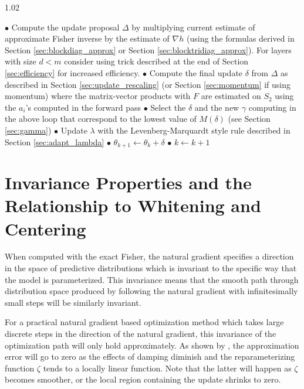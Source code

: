\documentclass[12pt]{article}
\newcommand{\acronym}{K-FAC}
\begin{document}
\begin{algorithm}[H]
\begin{spacing}{1.02}
\begin{algorithmic}
\ENDIF
\STATE $\bullet$ Compute the update proposal $\Delta$ by multiplying current estimate of approximate Fisher inverse by the estimate of $\nabla h$ (using the formulas derived in Section \ref{sec:blockdiag_approx} or Section \ref{sec:blocktridiag_approx}).  For layers with size $d < m$ consider using trick described at the end of Section \ref{sec:efficiency} for increased efficiency.
\STATE $\bullet$ Compute the final update $\delta$ from $\Delta$ as described in Section \ref{sec:update_rescaling} (or Section \ref{sec:momentum} if using momentum) where the matrix-vector products with $F$ are estimated on $S_2$ using the $a_i$'s computed in the forward pass
\ENDFOR
\STATE $\bullet$ Select the $\delta$ and the new $\gamma$ computing in the above loop that correspond to the lowest value of $M(\delta)$ (see Section \ref{sec:gamma})
	\STATE $\bullet$ Update $\lambda$ with the Levenberg-Marquardt style rule described in Section \ref{sec:adapt_lambda}
\ENDIF
\STATE $\bullet$ $\theta_{k+1} \gets \theta_k + \delta$
\STATE $\bullet$ $k \gets k+1$
\ENDWHILE
\end{algorithmic}
\end{spacing}
\caption{ High-level pseudocode for \acronym{} \label{alg:K-FAC} }
\end{algorithm}



\section{Invariance Properties and the Relationship to Whitening and Centering}
\label{sec:invariance}

When computed with the exact Fisher, the natural gradient specifies a direction in the space of predictive distributions which is invariant to the specific way that the model is parameterized.  This invariance means that the smooth path through distribution space produced by following the natural gradient with infinitesimally small steps will be similarly invariant.

For a practical natural gradient based optimization method which takes large discrete steps in the direction of the natural gradient, this invariance of the optimization path will only hold approximately.  As shown by \citet{ng_martens}, the approximation error will go to zero as the effects of damping diminish and the reparameterizing function $\zeta$ tends to a locally linear function.  Note that the latter will happen as $\zeta$ becomes smoother, or the local region containing the update shrinks to zero.  
\end{document}
